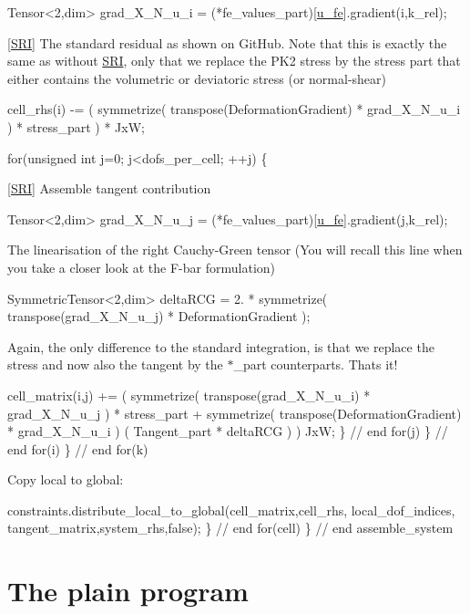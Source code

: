 \begin{DoxyCode}
Tensor<2,dim> grad\_X\_N\_u\_i = (*fe\_values\_part)[\hyperlink{assembly__routine__SRI_8cc_ae50a49c136e49c33fcd5a555a00009dd}{u\_fe}].gradient(i,k\_rel);
\end{DoxyCode}
 \mbox{[}\hyperlink{namespaceSRI}{S\+RI}\mbox{]} The standard residual as shown on Git\+Hub. Note that this is exactly the same as without \hyperlink{namespaceSRI}{S\+RI}, only that we replace the P\+K2 stress by the stress part  that either contains the volumetric or deviatoric stress (or normal-\/shear) 
\begin{DoxyCode}
cell\_rhs(i) -= ( symmetrize( transpose(DeformationGradient) * grad\_X\_N\_u\_i ) * stress\_part ) * JxW;

\textcolor{keywordflow}{for}(\textcolor{keywordtype}{unsigned} \textcolor{keywordtype}{int} j=0; j<dofs\_per\_cell; ++j)
\{
\end{DoxyCode}
 \mbox{[}\hyperlink{namespaceSRI}{S\+RI}\mbox{]} Assemble tangent contribution 
\begin{DoxyCode}
Tensor<2,dim> grad\_X\_N\_u\_j = (*fe\_values\_part)[\hyperlink{assembly__routine__SRI_8cc_ae50a49c136e49c33fcd5a555a00009dd}{u\_fe}].gradient(j,k\_rel);
\end{DoxyCode}
 The linearisation of the right Cauchy-\/\+Green tensor (You will recall this line when you take a closer look at the F-\/bar formulation) 
\begin{DoxyCode}
SymmetricTensor<2,dim> deltaRCG = 2. * symmetrize( transpose(grad\_X\_N\_u\_j) * DeformationGradient );
\end{DoxyCode}
 Again, the only difference to the standard integration, is that we replace the stress and now also the tangent by the $\ast$\+\_\+part counterparts. That\textquotesingle{}s it! 
\begin{DoxyCode}
            cell\_matrix(i,j) += (
                                    symmetrize( transpose(grad\_X\_N\_u\_i) * grad\_X\_N\_u\_j ) * stress\_part
                                    +
                                    symmetrize( transpose(DeformationGradient) * grad\_X\_N\_u\_i )
                                      ( Tangent\_part * deltaRCG )
                                )
                                  JxW;
        \} \textcolor{comment}{// end for(j)}
     \} \textcolor{comment}{// end for(i)}
\} \textcolor{comment}{// end for(k)}
\end{DoxyCode}
 Copy local to global\+: 
\begin{DoxyCode}
        constraints.distribute\_local\_to\_global(cell\_matrix,cell\_rhs,
                                local\_dof\_indices,
                                tangent\_matrix,system\_rhs,\textcolor{keyword}{false});
    \} \textcolor{comment}{// end for(cell)}
\} \textcolor{comment}{// end assemble\_system}
\end{DoxyCode}
\hypertarget{index_PlainCode}{}\section{The plain program}\label{index_PlainCode}

